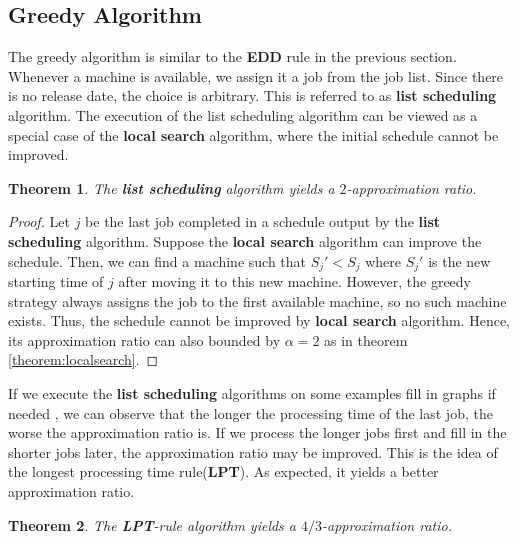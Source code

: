 \documentclass[11pt,psfig,times]{article}
\newtheorem{theorem}{Theorem}
\begin{document}
\subsection{Greedy Algorithm}
The greedy algorithm is similar to the \textbf{EDD} rule in the previous section. Whenever a machine is available, 
we assign it a job from the job list. Since there is no release date, the choice is arbitrary. 
This is referred to as \textbf{list scheduling} algorithm. The execution of the list scheduling algorithm can 
be viewed as a special case of the \textbf{local search} algorithm, where the initial schedule cannot be improved.
\begin{theorem}
    The \textbf{list scheduling} algorithm yields a $2$-approximation ratio.
\end{theorem}
\begin{proof}
    Let $j$ be the last job completed in a schedule output by the \textbf{list scheduling} algorithm. 
    Suppose the \textbf{local search} algorithm can improve the schedule. 
    Then, we can find a machine such that $S_j' < S_j$ where $S_j'$ is the new starting time of $j$ after moving it to 
    this new machine. However, the greedy strategy always assigns the job to the first available machine, so 
    no such machine exists. Thus, the schedule cannot be improved by \textbf{local search} algorithm. 
    Hence, its approximation ratio can also bounded by $\alpha = 2$ as in theorem \cref{theorem:localsearch}.
\end{proof}
If we execute the \textbf{list scheduling} algorithms on some examples \color{red} fill in graphs if needed \color{black}, we can observe that the longer the processing time of the last job, 
the worse the approximation ratio is. If we process the longer jobs first and fill in the shorter jobs later,
the approximation ratio may be improved. This is the idea of the longest processing time rule(\textbf{LPT}).
As expected, it yields a better approximation ratio. 
\begin{theorem}
    The \textbf{LPT}-rule algorithm yields a $4/3$-approximation ratio.
\end{theorem}
\end{document}
